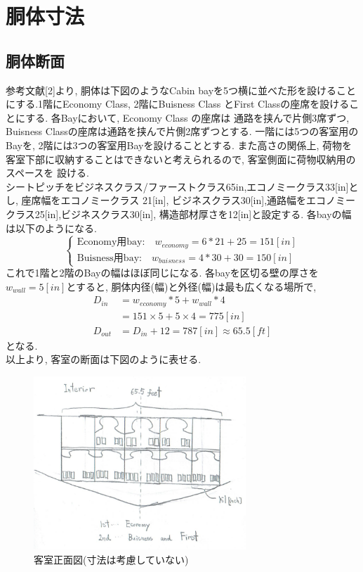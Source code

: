 \documentclass[class=article, crop=false, dvipdfmx, fleqn]{standalone}
\begin{document}
\section{胴体寸法}
\subsection{胴体断面}
参考文献[2]より, 胴体は下図のようなCabin bayを5つ横に並べた形を設けることにする.1階にEconomy Class,
2階にBuisness Class とFirst Classの座席を設けることにする. 各Bayにおいて, Economy Class の座席は
通路を挟んで片側3席ずつ, Buisness Classの座席は通路を挟んで片側2席ずつとする.
一階には5つの客室用のBayを, 2階には3つの客室用Bayを設けることとする.
また高さの関係上, 荷物を客室下部に収納することはできないと考えられるので, 客室側面に荷物収納用のスペースを
設ける.  \\
シートピッチをビジネスクラス/ファーストクラス65in,エコノミークラス33[in]とし, 座席幅をエコノミークラス
21[in], ビジネスクラス30[in],通路幅をエコノミークラス25[in],ビジネスクラス30[in], 構造部材厚さを12[in]と設定する.
各bayの幅は以下のようになる.
\begin{equation}
  \begin{cases}
    \text{Economy用bay:}  \quad w_{economy} = 6 * 21 + 25 = 151 [in] \\
    \text{Buisness用bay:} \quad w_{buisness} = 4 * 30 + 30 = 150 [in]
  \end{cases}
\end{equation}
これで1階と2階のBayの幅はほぼ同じになる. 各bayを区切る壁の厚さを$w_{wall} = 5[in]$とすると, 胴体内径(幅)と外径(幅)は最も広くなる場所で,
\begin{align}
   D_{in} &= w_{economy} * 5 + w_{wall} * 4 \\
          &= 151 \times 5 + 5 \times 4 =775 [in]\\
   D_{out} &= D_{in} + 12 = 787[in] \approx 65.5[ft]
\end{align}
となる. \\
以上より, 客室の断面は下図のように表せる.
\begin{figure}[H]
  \begin{center}
  \includegraphics[width=8cm]{../images/frontview.png}
  \caption{客室正面図(寸法は考慮していない)}
  \label{fig::frontview}
\end{center}
\end{figure}
\end{document}
